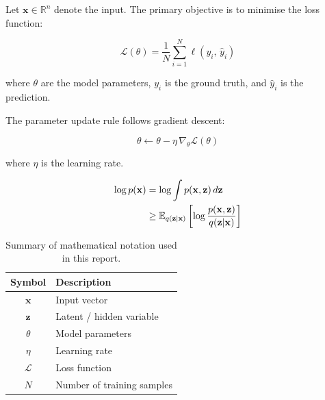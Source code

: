 \documentclass[12pt, a4paper]{article}
\begin{document}

Let $\mathbf{x} \in \mathbb{R}^n$ denote the input. The primary objective is to minimise the loss function:

\begin{equation}
    \mathcal{L}(\theta) = \frac{1}{N} \sum_{i=1}^{N} \ell\!\left(y_i,\, \hat{y}_i\right)
    \label{eq:loss}
\end{equation}

where $\theta$ are the model parameters, $y_i$ is the ground truth, and $\hat{y}_i$ is the prediction.

The parameter update rule follows gradient descent:

\begin{equation}
    \theta \leftarrow \theta - \eta \, \nabla_\theta \mathcal{L}(\theta)
    \label{eq:update}
\end{equation}

where $\eta$ is the learning rate.

\begin{align}
    \log p(\mathbf{x})
        &= \log \int p(\mathbf{x}, \mathbf{z})\, d\mathbf{z} \notag \\
        &\geq \mathbb{E}_{q(\mathbf{z}|\mathbf{x})}
              \left[\log \frac{p(\mathbf{x}, \mathbf{z})}{q(\mathbf{z}|\mathbf{x})}\right]
        \label{eq:elbo}
\end{align}

\begin{table}[H]
    \centering
    \caption{Summary of mathematical notation used in this report.}
    \label{tab:notation}
    \begin{tabular}{@{}cl@{}}
        \toprule
        \textbf{Symbol} & \textbf{Description} \\
        \midrule
        $\mathbf{x}$    & Input vector \\
        $\mathbf{z}$    & Latent / hidden variable \\
        $\theta$        & Model parameters \\
        $\eta$          & Learning rate \\
        $\mathcal{L}$   & Loss function \\
        $N$             & Number of training samples \\
        \bottomrule
    \end{tabular}
\end{table}
\end{document}
